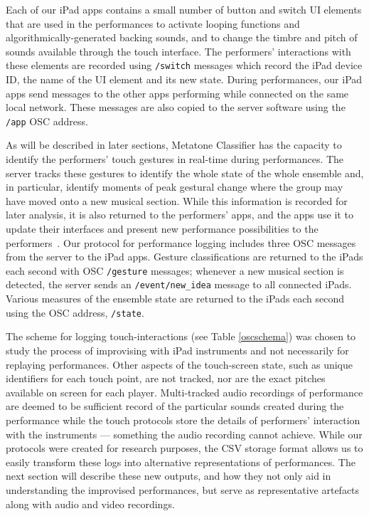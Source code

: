\documentclass[graybox]{svmult}
\begin{document}
Each of our iPad apps contains a small number of button and switch UI
elements that are used in the performances to activate looping
functions and algorithmically-generated backing sounds, and to change the
timbre and pitch of sounds available through the touch interface. The
performers' interactions with these elements are recorded using
\texttt{/switch} messages which record the iPad device ID, the name of
the UI element and its new state. During performances, our iPad apps
send messages to the other apps performing while connected on the same
local network. These messages are also copied to the server software
using the \texttt{/app} OSC address.

As will be described in later sections, Metatone Classifier has the
capacity to identify the performers' touch gestures in real-time
during performances. The server tracks these gestures to identify the
whole state of the whole ensemble and, in particular, identify moments
of peak gestural change where the group may have moved onto a new
musical section. While this information is recorded for later
analysis, it is also returned to the performers' apps, and the apps use it to
update their interfaces and present new performance possibilities to
the performers~\cite{Martin:2015jk}. Our protocol for performance
logging includes three OSC messages from the server to the iPad apps.
Gesture classifications are returned to the iPads each second with OSC
\texttt{/gesture} messages; whenever a new musical section is
detected, the server sends an \texttt{/event/new\_idea} message to all
connected iPads. Various measures of the ensemble state are
returned to the iPads each second using the OSC address,
\texttt{/state}.

The scheme for logging touch-interactions (see Table \ref{oscschema})
was chosen to study the process of improvising with iPad instruments
and not necessarily for replaying performances. Other aspects of the
touch-screen state, such as unique identifiers for each touch point, are
not tracked, nor are the exact pitches available on screen for each
player. Multi-tracked audio recordings of performance are deemed to be
sufficient record of the particular sounds created during the
performance while the touch protocols store the details of performers'
interaction with the instruments --- something the audio recording cannot achieve.
While our protocols were created for research purposes, the CSV
storage format allows us to easily transform these logs into
alternative representations of performances. The next section will
describe these new outputs, and how they not only aid in understanding
the improvised performances, but serve as representative artefacts
along with audio and video recordings.
\end{document}
